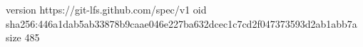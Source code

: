 version https://git-lfs.github.com/spec/v1
oid sha256:446a1dab5ab33878b9caae046e227ba632dcec1c7cd2f047373593d2ab1abb7a
size 485

